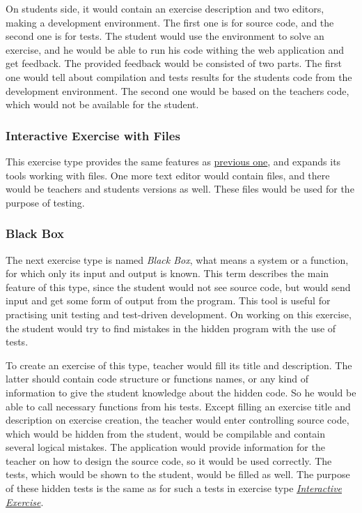             On students side, it would contain an exercise description and two editors, making a development environment. The first one is for source code, and the second one is for tests. The student would use the environment to solve an exercise, and he would be able to run his code withing the web application and get feedback. The provided feedback would be consisted of two parts. The first one would tell about compilation and tests results for the students code from the development environment. The second one would be based on the teachers code, which would not be available for the student.
            
            
            \subsubsection{Interactive Exercise with Files}
            This exercise type provides the same features as \hyperref[subsubsec:whitebox]{previous one}, and expands its tools working with files. One more text editor would contain files, and there would be teachers and students versions as well. These files would be used for the purpose of testing.
            
            
            \subsubsection{Black Box}
            \label{subsubsec:blackbox}
            The next exercise type is named \textit{Black Box}, what means a system or a function, for which only its input and output is known. This term describes the main feature of this type, since the student would not see source code, but would send input and get some form of output from the program. This tool is useful for practising unit testing and test-driven development. On working on this exercise, the student would try to find mistakes in the hidden program with the use of tests.
            
            To create an exercise of this type, teacher would fill its title and description. The latter should contain code structure or functions names, or any kind of information to give the student knowledge about the hidden code. So he would be able to call necessary functions from his tests. Except filling an exercise title and description on exercise creation, the teacher would enter controlling source code, which would be hidden from the student, would be compilable and contain several logical mistakes. The application would provide information for the teacher on how to design the source code, so it would be used correctly. The tests, which would be shown to the student, would be filled as well. The purpose of these hidden tests is the same as for such a tests in exercise type \hyperref[subsubsec:whitebox]{\textit{Interactive Exercise}}.
            
